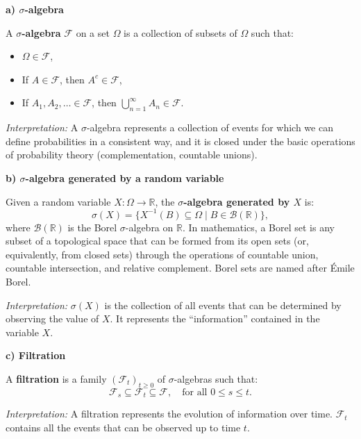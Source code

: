 
\textbf{a) \(\sigma\)-algebra}

A \textbf{\(\sigma\)-algebra} \( \mathcal{F} \) on a set \( \Omega \) is a collection of subsets of \( \Omega \) such that:
\begin{itemize}
  \item \( \Omega \in \mathcal{F} \),
  \item If \( A \in \mathcal{F} \), then \( A^c \in \mathcal{F} \),
  \item If \( A_1, A_2, \dots \in \mathcal{F} \), then \( \bigcup_{n=1}^\infty A_n \in \mathcal{F} \).
\end{itemize}

\textit{Interpretation:} A \(\sigma\)-algebra represents a collection of events for which we can define probabilities in a consistent way, and it is closed under the basic operations of probability theory (complementation, countable unions).

\vspace{1em}
\textbf{b) \(\sigma\)-algebra generated by a random variable}

Given a random variable \( X : \Omega \to \mathbb{R} \), the \textbf{\(\sigma\)-algebra generated by \( X \)} is:
\[
\sigma(X) = \{ X^{-1}(B) \subseteq \Omega \mid B \in \mathcal{B}(\mathbb{R}) \},
\]
where \( \mathcal{B}(\mathbb{R}) \) is the Borel \(\sigma\)-algebra on \( \mathbb{R} \). 
In mathematics, a Borel set is any subset of a topological space that can be formed from its open sets (or, equivalently, from closed sets) through the operations of countable union, countable intersection, and relative complement. Borel sets are named after Émile Borel.




\textit{Interpretation:} \( \sigma(X) \) is the collection of all events that can be determined by observing the value of \( X \). It represents the “information” contained in the variable \( X \).

\vspace{1em}
\textbf{c) Filtration}

A \textbf{filtration} is a family \( (\mathcal{F}_t)_{t \geq 0} \) of \(\sigma\)-algebras such that:
\[
\mathcal{F}_s \subseteq \mathcal{F}_t \subseteq \mathcal{F}, \quad \text{for all } 0 \leq s \leq t.
\]

\textit{Interpretation:} A filtration represents the evolution of information over time. \( \mathcal{F}_t \) contains all the events that can be observed up to time \( t \).

